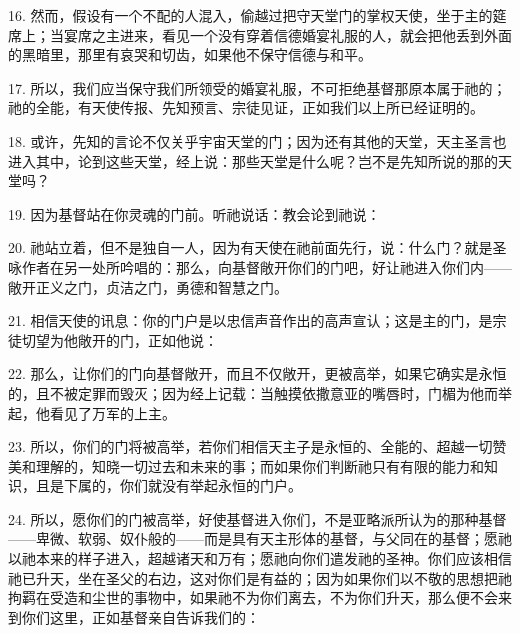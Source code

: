 16. 然而，假设有一个不配的人混入，偷越过把守天堂门的掌权天使，坐于主的筵席上；当宴席之主进来，看见一个没有穿着信德婚宴礼服的人，就会把他丢到外面的黑暗里，那里有哀哭和切齿，如果他不保守信德与和平。\par

17. 所以，我们应当保守我们所领受的婚宴礼服，不可拒绝基督那原本属于祂的；祂的全能，有天使传报、先知预言、宗徒见证，正如我们以上所已经证明的。\par

18. 或许，先知的言论不仅关乎宇宙天堂的门；因为还有其他的天堂，天主圣言也进入其中，论到这些天堂，经上说：那些天堂是什么呢？岂不是先知所说的那的天堂吗？\par

19. 因为基督站在你灵魂的门前。听祂说话：教会论到祂说：\par

20. 祂站立着，但不是独自一人，因为有天使在祂前面先行，说：什么门？就是圣咏作者在另一处所吟唱的：那么，向基督敞开你们的门吧，好让祂进入你们内——敞开正义之门，贞洁之门，勇德和智慧之门。\par

21. 相信天使的讯息：你的门户是以忠信声音作出的高声宣认；这是主的门，是宗徒切望为他敞开的门，正如他说：\par

22. 那么，让你们的门向基督敞开，而且不仅敞开，更被高举，如果它确实是永恒的，且不被定罪而毁灭；因为经上记载：当触摸依撒意亚的嘴唇时，门楣为他而举起，他看见了万军的上主。\par

23. 所以，你们的门将被高举，若你们相信天主子是永恒的、全能的、超越一切赞美和理解的，知晓一切过去和未来的事；而如果你们判断祂只有有限的能力和知识，且是下属的，你们就没有举起永恒的门户。\par

24. 所以，愿你们的门被高举，好使基督进入你们，不是亚略派所认为的那种基督——卑微、软弱、奴仆般的——而是具有天主形体的基督，与父同在的基督；愿祂以祂本来的样子进入，超越诸天和万有；愿祂向你们遣发祂的圣神。你们应该相信祂已升天，坐在圣父的右边，这对你们是有益的；因为如果你们以不敬的思想把祂拘羁在受造和尘世的事物中，如果祂不为你们离去，不为你们升天，那么便不会来到你们这里，正如基督亲自告诉我们的：\par

